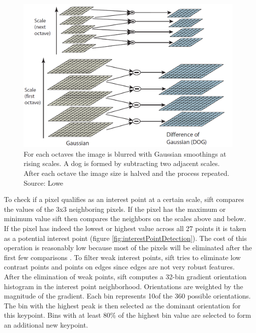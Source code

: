 \begin{figure}[ht]
	\centering
	\includegraphics[scale=0.3]{figures/theorySIFT_dogScaleFiltering}
	\caption{For each octaves the image is blurred with Gaussian smoothings at rising scales. A \gls{dog} is formed by subtracting two adjacent scales. After each octave the image size is halved and the process repeated. Source: Lowe \cite{Lowe2004}}
	\label{fig:dogScaleFiltering}
\end{figure}

To check if a pixel qualifies as an interest point at a certain scale, \gls{sift} compares the values of the 3x3 neighboring pixels. If the pixel has the maximum or minimum value \gls{sift} then compares the neighbors on the scales above and below. If the pixel has indeed the lowest or highest value across all 27 points it is taken as a potential interest point {(figure \ref{fig:interestPointDetection})}. The cost of this operation is reasonably low because most of the pixels will be eliminated after the first few comparisons \cite{Lowe2004}. To filter weak interest points, \gls{sift} tries to eliminate low contrast points and points on edges since edges are not very robust features. After the elimination of weak points, \gls{sift} computes a 32-bin gradient orientation histogram in the interest point neighborhood. Orientations are weighted by the magnitude of the gradient. Each bin represents 10\degree of the 360 possible orientations. The bin with the highest peak is then selected as the dominant orientation for this keypoint. Bins with at least 80\% of the highest bin value are selected to form an additional new keypoint.

